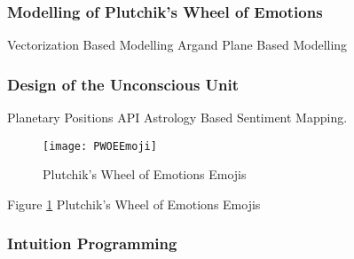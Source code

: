 \subsubsection{Modelling of Plutchik’s Wheel of Emotions}
Vectorization Based Modelling Argand Plane Based Modelling

\subsubsection{Design of the Unconscious Unit}
Planetary Positions API Astrology Based Sentiment Mapping.
\begin{figure}[H]
	\texttt{[image: PWOEEmoji]}
	\caption{Plutchik’s Wheel of Emotions Emojis}
	\label{Fig:fig2}
\end{figure}
Figure \ref{Fig:fig2} Plutchik’s Wheel of Emotions Emojis

\subsubsection{Intuition Programming}
